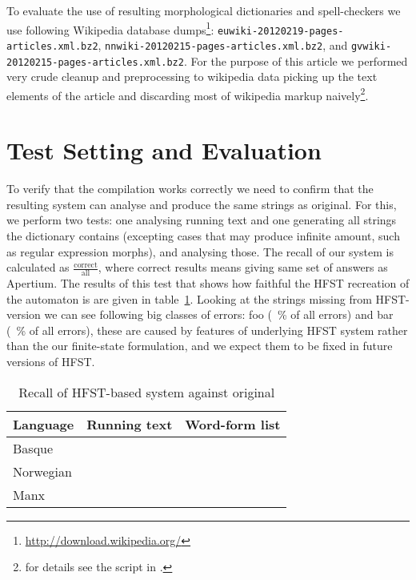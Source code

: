\documentclass[10pt,a4paper]{article}
\begin{document}
To evaluate the use of resulting morphological dictionaries and spell-checkers
we use following Wikipedia database 
dumps\footnote{\url{http://download.wikipedia.org/}}: 
\texttt{euwiki-20120219-pages-articles.xml.bz2}, 
\texttt{nnwiki-20120215-pages-articles.xml.bz2},
and \texttt{gvwiki-20120215-pages-articles.xml.bz2}. For the purpose of this
article we performed very crude cleanup and preprocessing to wikipedia data
picking up the text elements of the article and discarding most of wikipedia
markup naively\footnote{for details see the script in .}.

\section{Test Setting and Evaluation}
\label{sec:evaluation}

To verify that the compilation works correctly we need to confirm that the
resulting system can analyse and produce the same strings as original. For
this, we perform two tests: one analysing running text and one generating all
strings the dictionary contains (excepting cases that may produce
infinite amount, such as regular expression morphs), and analysing those. The
recall of our system is calculated as $\frac{\mathrm{correct}}{\mathrm{all}}$,
where correct results means giving same set of answers as Apertium.
The results of this test that shows how faithful the HFST recreation of the
automaton is are given in table~\ref{table:recall}. Looking at the strings
missing from HFST-version we can see following big classes of errors:
foo (~\% of all errors) and bar (~\% of all errors), these are caused by
features of underlying HFST system rather than the our finite-state formulation,
and we expect them to be fixed in future versions of HFST.

\begin{table}[h]
\begin{center}
\begin{tabular}{|l|r|r|}
\hline
\bf Language & \bf Running text & \bf Word-form list \\
\hline
Basque       & & \\
Norwegian    & & \\
Manx         & & \\
\hline
\end{tabular}
\caption{Recall of HFST-based system against original
\label{table:recall}}
\end{center}
\end{table}
\end{document}
